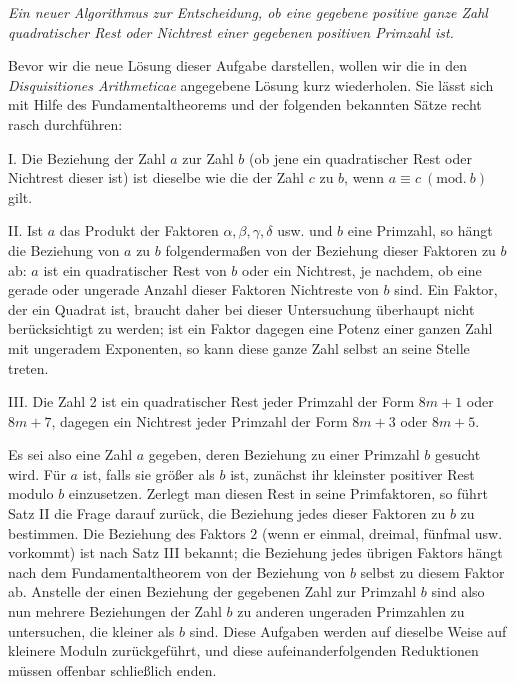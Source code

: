 \begin{center}\textit{Ein neuer Algorithmus zur Entscheidung, ob eine gegebene positive ganze Zahl quadratischer Rest oder Nichtrest einer gegebenen positiven Primzahl ist.}\end{center}


Bevor wir die neue Lösung dieser Aufgabe darstellen, wollen wir die in den \textit{Disquisitiones Arithmeticae} angegebene Lösung kurz wiederholen. Sie lässt sich mit Hilfe des Fundamentaltheorems und der folgenden bekannten Sätze recht rasch durchführen:

I. Die Beziehung der Zahl $a$ zur Zahl $b$ (ob jene ein quadratischer Rest oder Nichtrest dieser ist) ist dieselbe wie die der Zahl $c$ zu $b$, wenn $a\equiv c\ (\mathrm{mod.}\ b)$ gilt.

II. Ist $a$ das Produkt der Faktoren $\alpha,\beta,\gamma,\delta$ usw. und $b$ eine Primzahl, so hängt die Beziehung von $a$ zu $b$ folgendermaßen von der Beziehung dieser Faktoren zu $b$ ab: $a$ ist ein quadratischer Rest von $b$ oder ein Nichtrest, je nachdem, ob eine gerade oder ungerade Anzahl dieser Faktoren Nichtreste von $b$ sind. Ein Faktor, der ein Quadrat ist, braucht daher bei dieser Untersuchung überhaupt nicht berücksichtigt zu werden; ist ein Faktor dagegen eine Potenz einer ganzen Zahl mit ungeradem Exponenten, so kann diese ganze Zahl selbst an seine Stelle treten.

III. Die Zahl 2 ist ein quadratischer Rest jeder Primzahl der Form $8m+1$ oder $8m+7$, dagegen ein Nichtrest jeder Primzahl der Form $8m+3$ oder $8m+5$.

%
Es sei also eine Zahl $a$ gegeben, deren Beziehung zu einer Primzahl $b$ gesucht wird. Für $a$ ist, falls sie größer als $b$ ist, zunächst ihr kleinster positiver Rest modulo $b$ einzusetzen. Zerlegt man diesen Rest in seine Primfaktoren, so führt Satz II die Frage darauf zurück, die Beziehung jedes dieser Faktoren zu $b$ zu bestimmen. Die Beziehung des Faktors $2$ (wenn er einmal, dreimal, fünfmal usw. vorkommt) ist nach Satz III bekannt; die Beziehung jedes übrigen Faktors hängt nach dem Fundamentaltheorem von der Beziehung von $b$ selbst zu diesem Faktor ab. Anstelle der einen Beziehung der gegebenen Zahl zur Primzahl $b$ sind also nun mehrere Beziehungen der Zahl $b$ zu anderen ungeraden Primzahlen zu untersuchen, die kleiner als $b$ sind. Diese Aufgaben werden auf dieselbe Weise auf kleinere Moduln zurückgeführt, und diese aufeinanderfolgenden Reduktionen müssen offenbar schließlich enden.


